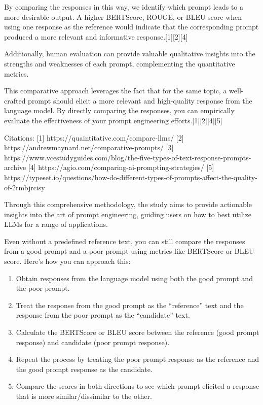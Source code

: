 \documentclass[
]{agujournal2019}
\providecommand{\tightlist}{%
  \setlength{\itemsep}{0pt}\setlength{\parskip}{0pt}}\usepackage{longtable,booktabs,array}
\begin{document}
By comparing the responses in this way, we identify which prompt leads
to a more desirable output. A higher BERTScore, ROUGE, or BLEU score
when using one response as the reference would indicate that the
corresponding prompt produced a more relevant and informative
response.{[}1{]}{[}2{]}{[}4{]}

Additionally, human evaluation can provide valuable qualitative insights
into the strengths and weaknesses of each prompt, complementing the
quantitative metrics.

This comparative approach leverages the fact that for the same topic, a
well-crafted prompt should elicit a more relevant and high-quality
response from the language model. By directly comparing the responses,
you can empirically evaluate the effectiveness of your prompt
engineering efforts.{[}1{]}{[}2{]}{[}4{]}{[}5{]}

Citations: {[}1{]} https://quaintitative.com/compare-llms/ {[}2{]}
https://andrewmaynard.net/comparative-prompts/ {[}3{]}
https://www.vcestudyguides.com/blog/the-five-types-of-text-response-prompts-archive
{[}4{]} https://agio.com/comparing-ai-prompting-strategies/ {[}5{]}
https://typeset.io/questions/how-do-different-types-of-prompts-affect-the-quality-of-2rmbjrcisy

Through this comprehensive methodology, the study aims to provide
actionable insights into the art of prompt engineering, guiding users on
how to best utilize LLMs for a range of applications.

Even without a predefined reference text, you can still compare the
responses from a good prompt and a poor prompt using metrics like
BERTScore or BLEU score. Here's how you can approach this:

\begin{enumerate}
\def\labelenumi{\arabic{enumi}.}
\tightlist
\item
  Obtain responses from the language model using both the good prompt
  and the poor prompt.
\item
  Treat the response from the good prompt as the ``reference'' text and
  the response from the poor prompt as the ``candidate'' text.
\item
  Calculate the BERTScore or BLEU score between the reference (good
  prompt response) and candidate (poor prompt response).
\item
  Repeat the process by treating the poor prompt response as the
  reference and the good prompt response as the candidate.
\item
  Compare the scores in both directions to see which prompt elicited a
  response that is more similar/dissimilar to the other.
\end{enumerate}
\end{document}
